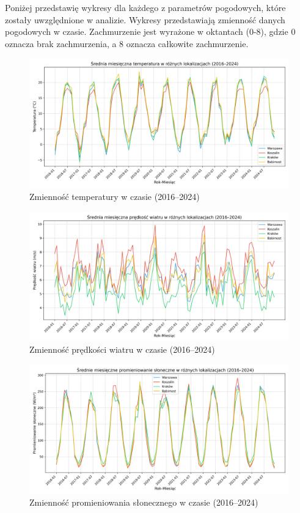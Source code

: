 Poniżej przedstawię wykresy dla każdego z parametrów pogodowych, które zostały uwzględnione w analizie. Wykresy przedstawiają zmienność danych pogodowych w czasie. Zachmurzenie jest wyrażone w oktantach (0-8), gdzie 0 oznacza brak zachmurzenia, a 8 oznacza całkowite zachmurzenie.

\begin{figure}[H]
    \centering
    \includegraphics[width=\textwidth]{../plots/weather/temp_time_series_full.png}
    \caption{Zmienność temperatury w czasie (2016–2024)}
    \label{fig:temp-time-series-full}
\end{figure}

\begin{figure}[H]
    \centering
    \includegraphics[width=\textwidth]{../plots/weather/wind_speed_time_series_full.png}
    \caption{Zmienność prędkości wiatru w czasie (2016–2024)}
    \label{fig:wind-speed-time-series-full}
\end{figure}

\begin{figure}[H]
    \centering
    \includegraphics[width=\textwidth]{../plots/weather/solar_radiation_time_series_full.png}
    \caption{Zmienność promieniowania słonecznego w czasie (2016–2024)}
    \label{fig:solar-radiation-time-series-full}
\end{figure}

